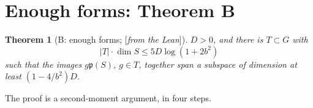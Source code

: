 \documentclass[11pt]{amsart}
\numberwithin{equation}{section}
\newtheorem{theorem}{Theorem}[section]
\theoremstyle{definition}
\theoremstyle{remark}
\newcommand{\status}[1]{\textup{[\emph{#1}]}}
\begin{document}
\section{Enough forms: Theorem B}\label{sec:thmB}

\begin{theorem}[B: enough forms; \status{from the Lean}]\label{thm:B}
$D>0$, and there is $T\subset G$ with
\begin{equation}
 |T|\cdot\dim S\le5D\log(1+2b^2)
\end{equation}
such that the images $g\mathfrak p(S)$, $g\in T$, together span a subspace of dimension at least $(1-4/b^2)D$.
\end{theorem}

The proof is a second-moment argument, in four steps.
\end{document}
